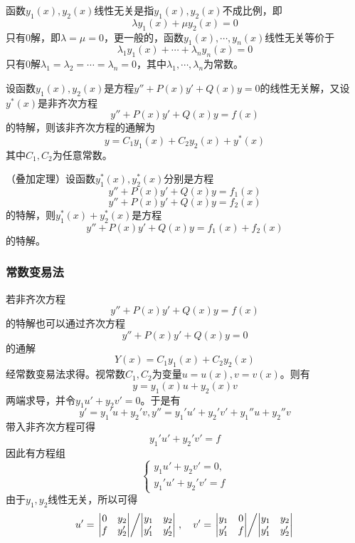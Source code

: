 函数$y_1(x),y_2(x)$线性无关是指$y_1(x),y_2(x)$不成比例，即
\[ \lambda y_1(x)+\mu y_2(x) = 0 \]
只有$0$解，即$\lambda = \mu = 0$，更一般的，函数$y_1(x),\cdots,y_n(x)$线性无关等价于
\[ \lambda_1y_1(x) + \cdots + \lambda_ny_n(x) = 0 \]
只有$0$解$\lambda_1=\lambda_2=\cdots=\lambda_n = 0$，其中$\lambda_1,\cdots,\lambda_n$为常数。

\begin{theorem}
    设函数$y_1(x),y_2(x)$是方程$y''+P(x)y'+Q(x)y=0$的线性无关解，又设$y^*(x)$是非齐次方程
    \[ y'' + P(x)y' + Q(x)y = f(x) \]
    的特解，则该非齐次方程的通解为
    \[ y = C_1y_1(x) + C_2y_2(x) + y^*(x) \]
    其中$C_1, C_2$为任意常数。
\end{theorem}

\begin{theorem}
    （叠加定理）设函数$y_1^*(x), y_2^*(x)$分别是方程
    \[ y'' + P(x)y' + Q(x)y = f_1(x) \]
    \[ y'' + P(x)y' + Q(x)y = f_2(x) \]
    的特解，则$y_1^*(x)+y_2^*(x)$是方程
    \[ y'' + P(x)y' + Q(x)y = f_1(x) + f_2(x) \]
    的特解。
\end{theorem}

\subsubsection{常数变易法}
若非齐次方程\[ y'' + P(x)y' + Q(x)y = f(x) \]的特解也可以通过齐次方程
\[ y'' + P(x)y' + Q(x)y = 0 \]
的通解
\[ Y(x) = C_1y_1(x) + C_2y_2(x) \]
经常数变易法求得。视常数$C_1,C_2$为变量$u=u(x),v=v(x)$。则有
\[ y = y_1(x)u + y_2(x)v \]
两端求导，并令$y_1u' + y_2v' = 0$。于是有
\[ y' = y_1'u+y_2'v, y'' = y_1'u' + y_2'v' + y_1''u + y_2''v \]
带入非齐次方程可得
\[ y_1'u'+y_2'v' = f \]
因此有方程组
\[
    \begin{cases}
        y_1u'+y_2v' = 0, \\
        y_1'u'+y_2'v'=f
    \end{cases}
\]
由于$y_1,y_2$线性无关，所以可得
\[
    u' = \left.
    \begin{vmatrix}
        0 & y_2  \\
        f & y_2'
    \end{vmatrix}
    \middle/
    \begin{vmatrix}
        y_1  & y_2  \\
        y_1' & y_2'
    \end{vmatrix}
    \right.
    ,
    \quad
    v' = \left.
    \begin{vmatrix}
        y_1  & 0 \\
        y_1' & f
    \end{vmatrix}
    \middle/
    \begin{vmatrix}
        y_1  & y_2  \\
        y_1' & y_2'
    \end{vmatrix}
    \right.
\]

